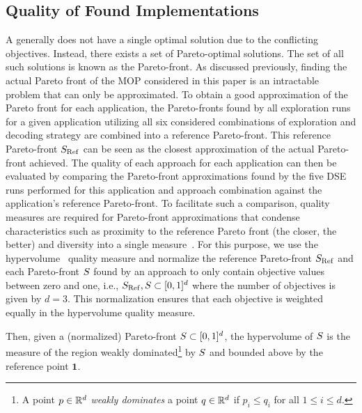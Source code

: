\subsection{Quality of Found Implementations}
A  generally does not have a single optimal solution due to the conflicting objectives.
Instead, there exists a set of Pareto-optimal solutions.
The set of all such solutions is known as the Pareto-front.
As discussed previously, finding the actual Pareto front of the \ac{MOP} considered in this paper is an intractable problem that can only be approximated.
To obtain a good approximation of the Pareto front for each application, the Pareto-fronts found by all exploration runs for a given application utilizing all six considered combinations of exploration and decoding strategy are combined into a reference Pareto-front.
This reference Pareto-front $S_\mathrm{Ref}$ can be seen as the closest approximation of the actual Pareto-front achieved.
The quality of each approach for each application can then be evaluated by comparing the Pareto-front approximations found by the five \ac{DSE} runs performed for this application and approach combination against the application's reference Pareto-front.
To facilitate such a comparison, quality measures are required for Pareto-front approximations that condense characteristics such as proximity to the reference Pareto front (the closer, the better) and diversity into a single measure~\cite{Guerrero:2022}.
For this purpose, we use the hypervolume~\cite{hyper} quality measure and normalize the reference Pareto-front $S_\mathrm{Ref}$ and each Pareto-front $S$ found by an approach to only contain objective values between zero and one, i.e., $S_\mathrm{Ref}, S \subset [0,1]^d$ where the number of objectives is given by $d = 3$.
This normalization ensures that each objective is weighted equally in the hypervolume quality measure.
\par
Then, given a (normalized) Pareto-front $S \subset [0,1]^d$, the hypervolume of $S$ is the measure of the region weakly dominated\footnote{A point $p \in \mathbb{R}^d$ \emph{weakly dominates} a point $q \in \mathbb{R}^d$ if $p_i\leq q_i$ for all $1\leq i \leq d$.} by $S$ and bounded above by the reference point $\mathbf{1}$. %
